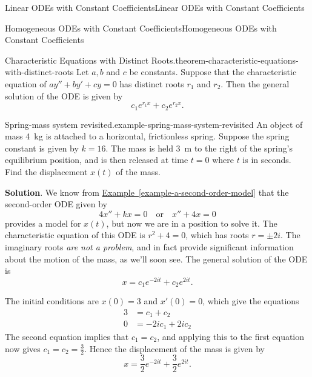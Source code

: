 \documentclass[10pt,]{book}
\numberwithin{equation}{section}
\newcommand{\amp}{&}
\begin{document}
\begin{chapterptx}{Linear ODEs with Constant Coefficients}{}{Linear ODEs with Constant Coefficients}{}{}
\begin{sectionptx}{Homogeneous ODEs with Constant Coefficients}{}{Homogeneous ODEs with Constant Coefficients}{}{}
\begin{theorem}{Characteristic Equations with Distinct Roots.}{}{theorem-characteristic-equations-with-distinct-roots}%
\hypertarget{p-185}{}%
Let \(a,b\) and \(c\) be constants. Suppose that the characteristic equation of \(ay'' + by' + cy = 0\) has distinct roots \(r_{1}\) and \(r_{2}\). Then the general solution of the ODE is given by%
\begin{equation*}
c_{1}e^{r_{1}x} + c_{2}e^{r_{2}x}.
\end{equation*}
%
\end{theorem}
\begin{example}{Spring-mass system revisited.}{example-spring-mass-system-revisited}%
\hypertarget{p-186}{}%
An object of mass \SI{4}{\kilo\gram} is attached to a horizontal, frictionless spring. Suppose the spring constant is given by \(k=16\). The mass is held \SI{3}{\meter} to the right of the spring's equilibrium position, and is then released at time \(t=0\) where \(t\) is in seconds. Find the displacement \(x(t)\) of the mass.%
\par\smallskip%
\noindent\textbf{Solution}.\hypertarget{solution-28}{}\quad%
\hypertarget{p-187}{}%
We know from \hyperref[example-a-second-order-model]{Example~\ref{example-a-second-order-model}} that the second-order ODE given by%
\begin{equation*}
4x'' + kx = 0\quad\text{or}\quad x'' + 4x = 0
\end{equation*}
provides a model for \(x(t)\), but now we are in a position to solve it. The characteristic equation of this ODE is \(r^{2} + 4 = 0\), which has roots \(r=\pm2i\). The imaginary roots \emph{are not a problem}, and in fact provide significant information about the motion of the mass, as we'll soon see. The general solution of the ODE is%
\begin{equation*}
x = c_{1}e^{-2it} + c_{2}e^{2it}.
\end{equation*}
%
\par
\hypertarget{p-188}{}%
The initial conditions are \(x(0) = 3\) and \(x'(0) = 0\), which give the equations%
\begin{align*}
3 \amp = c_{1} + c_{2} \\
0 \amp = -2ic_{1} + 2ic_{2} 
\end{align*}
The second equation implies that \(c_{1} = c_{2}\), and applying this to the first equation now gives \(c_{1} = c_{2} = \frac{3}{2}\). Hence the displacement of the mass is given by%
\begin{equation*}
x = \frac{3}{2}e^{-2it} + \frac{3}{2}e^{2it}.

\end{equation*}
\end{example}
\end{sectionptx}
\end{chapterptx}
\end{document}
